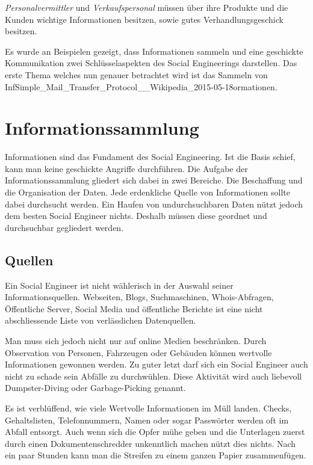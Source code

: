 \textit{Personalvermittler} und \textit{Verkaufspersonal} müssen über ihre Produkte und die Kunden wichtige Informationen besitzen, sowie gutes Verhandlungsgeschick besitzen.

Es wurde an Beispielen gezeigt, dass Informationen sammeln und eine geschickte Kommunikation zwei Schlüsselaspekten des Social Engineerings darstellen. Das erste Thema welches nun genauer betrachtet wird ist das Sammeln von InfSimple_Mail_Transfer_Protocol__Wikipedia_2015-05-18ormationen.

\section{Informationssammlung}
Informationen sind das Fundament des Social Engineering. Ist die Basis schief, kann man keine geschickte Angriffe durchführen. Die Aufgabe der Informationssammlung gliedert sich dabei in zwei Bereiche. Die Beschaffung und die Organisation der Daten. Jede erdenkliche Quelle von Informationen sollte dabei durchsucht werden. Ein Haufen von undurchsuchbaren Daten nützt jedoch dem besten Social Engineer nichts. Deshalb müssen diese geordnet und durchsuchbar gegliedert werden.

\subsection{Quellen}
Ein Social Engineer ist nicht wählerisch in der Auswahl seiner Informationsquellen. Webseiten, Blogs, Suchmaschinen, Whois-Abfragen, Öffentliche Server, Social Media und öffentliche Berichte ist eine nicht abschliessende Liste von verlässlichen Datenquellen. 

Man muss sich jedoch nicht nur auf online Medien beschränken. Durch Observation von Personen, Fahrzeugen oder Gebäuden können wertvolle Informationen gewonnen werden. Zu guter letzt darf sich ein Social Engineer auch nicht zu schade sein Abfälle zu durchwühlen. Diese Aktivität wird auch liebevoll Dumpster-Diving oder Garbage-Picking genannt. 

Es ist verblüffend, wie viele Wertvolle Informationen im Müll landen. Checks, Gehaltslisten, Telefonnummern, Namen oder sogar Passwörter werden oft im Abfall entsorgt. Auch wenn sich die Opfer mühe geben und die Unterlagen zuerst durch einen Dokumentenschredder unkenntlich machen nützt dies nichts. Nach ein paar Stunden kann man die Streifen zu einem ganzen Papier zusammenfügen. 

